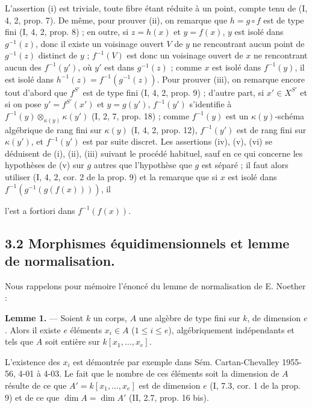 L'assertion (i) est triviale, toute fibre étant réduite à un point, compte tenu de (I, 4, 2, prop. 7). De même, pour prouver (ii), on remarque que $h = g \circ f$ est de type fini (I, 4, 2, prop. 8) ; en outre, si $z = h(x)$ et $y = f(x)$, $y$ est isolé dans $g^{-1}(z)$, donc il existe un voisinage ouvert $V$ de $y$ ne rencontrant aucun point de $g^{-1}(z)$ distinct de $y$ ; $f^{-1}(V)$ est donc un voisinage ouvert de $x$ ne rencontrant aucun des $f^{-1}(y')$, où $y'$ est dans $g^{-1}(z)$ ; comme $x$ est isolé dans $f^{-1}(y)$, il est isolé dans $h^{-1}(z) = f^{-1}(g^{-1}(z))$. Pour prouver (iii), on remarque encore tout d'abord que $f^{S'}$ est de type fini (I, 4, 2, prop. 9) ; d'autre part, si $x' \in X^{S'}$ et si on pose $y' = f^{S'}(x')$ et $y = g(y')$, $f^{-1}(y')$ s'identifie à $f^{-1}(y) \otimes_{\kappa(y)} \kappa(y')$ (I, 2, 7, prop. 18) ; comme $f^{-1}(y)$ est un $\kappa(y)$-schéma algébrique de rang fini sur $\kappa(y)$ (I, 4, 2, prop. 12), $f^{-1}(y')$ est de rang fini sur $\kappa(y')$, et $f^{-1}(y')$ est par suite discret. Les assertions (iv), (v), (vi) se déduisent de (i), (ii), (iii) suivant le procédé habituel, sauf en ce qui concerne les hypothèses de (v) sur $g$ autres que l'hypothèse que $g$ est séparé ; il faut alors utiliser (I, 4, 2, cor. 2 de la prop. 9) et la remarque que si $x$ est isolé dans $f^{-1}(g^{-1}(g(f(x))))$, il

\newpage


l'est a fortiori dans $f^{-1}(f(x))$.

\subsection*{3.2 Morphismes équidimensionnels et lemme de normalisation.}

Nous rappelons pour mémoire l'énoncé du lemme de normalisation de E. Noether :

\textbf{Lemme 1.} --- Soient $k$ un corps, $A$ une algèbre de type fini sur $k$, de dimension $e$. Alors il existe $e$ éléments $x_i \in A$ ($1 \le i \le e$), algébriquement indépendants et tels que $A$ soit entière sur $k[x_1, \dots, x_e]$.

L'existence des $x_i$ est démontrée par exemple dans Sém. Cartan-Chevalley 1955-56, 4-01 à 4-03. Le fait que le nombre de ces éléments soit la dimension de $A$ résulte de ce que $A' = k[x_1, \dots, x_e]$ est de dimension $e$ (I, 7.3, cor. 1 de la prop. 9) et de ce que $\dim A = \dim A'$ (II, 2.7, prop. 16 bis).

